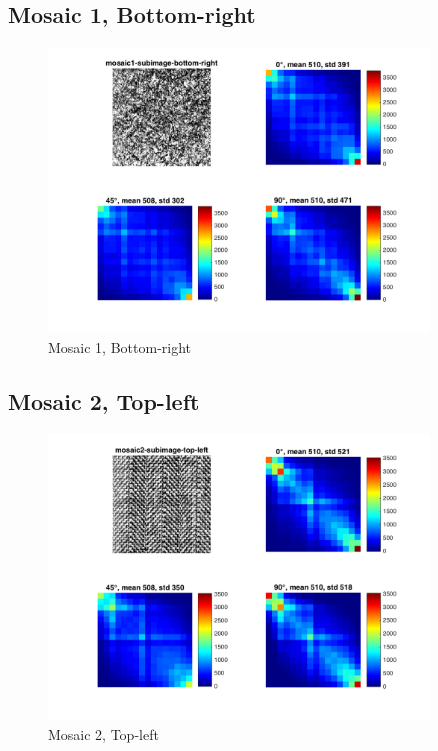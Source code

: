 \documentclass[a4paper,12pt,titlepage]{article}
\begin{document}
\subsection{Mosaic 1, Bottom-right}
\begin{figure}[H]
\includegraphics[width=0.9\textwidth]{partB-mosaic1-subimage-bottom-right}
\caption{Mosaic 1, Bottom-right}
\label{fig:Mosaic1SubimageBottomRight}
\end{figure}

\subsection{Mosaic 2, Top-left}
\begin{figure}[H]
\includegraphics[width=0.9\textwidth]{partB-mosaic2-subimage-top-left}
\caption{Mosaic 2, Top-left}
\label{fig:Mosaic2SubimageTopLeft}
\end{figure}
\end{document}
